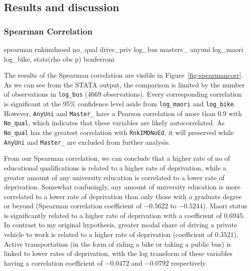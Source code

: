 \documentclass[
  letterpaper,
  DIV=11,
  numbers=noendperiod,
  oneside]{scrartcl}
\newenvironment{Shaded}{\begin{snugshade}}{\end{snugshade}}
\newcommand{\KeywordTok}[1]{\textcolor[rgb]{0.00,0.23,0.31}{#1}}
\newcommand{\NormalTok}[1]{\textcolor[rgb]{0.00,0.23,0.31}{#1}}
\begin{document}
\hypertarget{results-and-discussion}{%
\subsection{Results and discussion}\label{results-and-discussion}}

\hypertarget{spearman-correlation-1}{%
\subsubsection{Spearman Correlation}\label{spearman-correlation-1}}

\begin{Shaded}
\begin{Highlighting}[]
\KeywordTok{spearman}\NormalTok{ rnkimdnoed no\_qual drive\_priv log\_bus masters\_ anyuni log\_maori log\_bike, }\KeywordTok{stats}\NormalTok{(rho }\KeywordTok{obs} \KeywordTok{p}\NormalTok{) bonferroni}
\end{Highlighting}
\end{Shaded}

The results of the Spearman correlation are visible in
Figure~\ref{fig-spearmancorr}. As we can see from the STATA output, the
comparison is limited by the number of observations in \texttt{log\_bus}
(4669 observations). Every corresponding correlation is significant at
the 95\% confidence level aside from \texttt{log\_maori} and
\texttt{log\_bike}. However, \texttt{AnyUni} and \texttt{Master\_} have
a Pearson correlation of more than \(0.9\) with \texttt{No\_qual}, which
indicates that these variables are likely autocorrelated. As
\texttt{No\_qual} has the greatest correlation with \texttt{RnkIMDNoEd},
it will preserved while \texttt{AnyUni} and \texttt{Master\_} are
excluded from further analysis.


From our Spearman correlation, we can conclude that a higher rate of no
of educational qualifications is related to a higher rate of
deprivation, while a greater amount of any university education is
correlated to a lower rate of deprivation. Somewhat confusingly, any
amount of university education is more correlated to a lower rate of
deprivation than only those with a graduate degree or beyond (Spearman
correlation coefficient of \(-0.5622\) to \(-0.5244\)). Maori status is
significantly related to a higher rate of deprivation with a coefficient
of \(0.6945\). In contrast to my original hypothesis, greater modal
share of driving a private vehicle to work is related to a higher rate
of deprivation (coefficient of \(0.3521\)). Active transportation (in
the form of riding a bike or taking a public bus) is linked to lower
rates of deprivation, with the log transform of these variables having a
correlation coefficient of \(-0.0472\) and \(-0.0792\) respectively.
\end{document}
